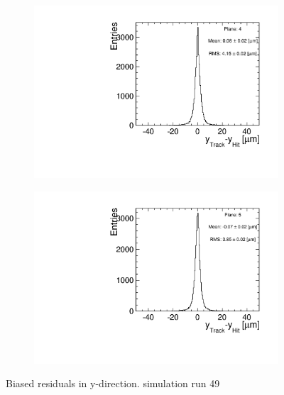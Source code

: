 \begin{figure}[htbp]
\begin{subfigure}[b]{0.3\textwidth}
    \includegraphics[width=\textwidth]{figures/Telescope/biasedResiduals/BiasedResiduals_run49_PlaneYRMS4.pdf}
    \caption{}
  \end{subfigure}\hfill
  \begin{subfigure}[b]{0.3\textwidth}
    \includegraphics[width=\textwidth]{figures/Telescope/biasedResiduals/BiasedResiduals_run49_PlaneYRMS5.pdf}
    \caption{}
  \end{subfigure}
  \caption{Biased residuals in y-direction. simulation run 49}
  \label{fig:telescope_biasedResiduals_simu_Y}
\end{figure}
